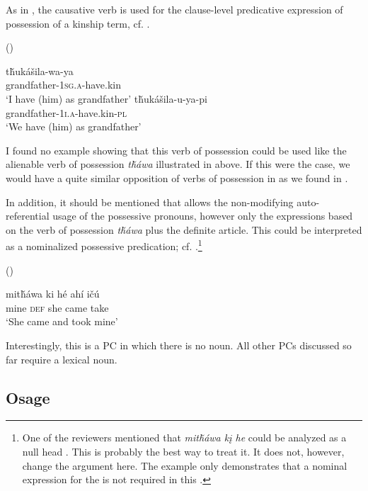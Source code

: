 \documentclass[output=paper]{LSP/langsci}
\begin{document}
As in , the causative verb is used for the clause-level predicative expression of possession of a kinship term, cf. .

\ea {} (\citealt[102]{Buechel1939}) \label{lakotahavegrandfather}

\ea \gll t\v{h}ukášila-wa-ya \\
grandfather-\textsc{1sg.a}-have.kin \\
\trans `I have (him) as grandfather'
\ex \gll t\v{h}ukášila-u-ya-pi \\
grandfather-\textsc{1i.a}-have.kin-\textsc{pl} \\
\glt `We have (him) as grandfather'
\z \z

I found no example showing that this verb of possession could be used like the alienable verb of possession \textit{t\v{h}\'awa} illustrated in  above. If this were the case, we would have a quite similar opposition of verbs of possession in  as we found in . 

In addition, it should be mentioned that  allows the non-modifying auto-referential usage of the possessive pronouns, however only the expressions based on the verb of possession \textit{t\v{h}\'awa} plus the definite article. This could be interpreted as a nominalized possessive predication; cf. .\footnote{One of the reviewers mentioned that \textit{mit\v{h}áwa kį he} could be analyzed as a null head . This is probably the best way to treat it. It does not, however, change the argument here. The example only demonstrates that a nominal expression for the  is not required in this .}

\ea	{} (\citealt[22]{Buechel1939}) \label{lakotatookmine}

\gll mit\v{h}áwa ki      h\'e   ahí     i\v{c}ú \\
mine        \textsc{def} she came take \\
\glt `She came and took mine'
\z

Interestingly, this is a PC in which there is no  noun. All other PCs discussed so far require a  lexical noun.
 
\subsection{Osage}\label{sec:helmbrecht:4.5} \label{osage}
\end{document}
